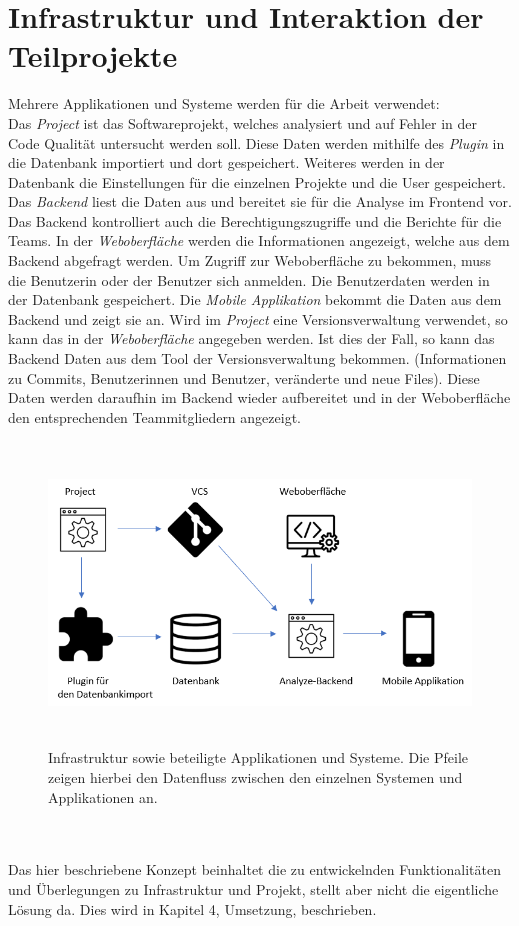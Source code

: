 \section{Infrastruktur und Interaktion der Teilprojekte}
Mehrere Applikationen und Systeme werden für die Arbeit verwendet: \\
Das \textit{Project} ist das Softwareprojekt, welches analysiert und auf Fehler in der Code Qualität untersucht werden soll. Diese Daten werden mithilfe des \textit{Plugin} in die Datenbank importiert und dort gespeichert. Weiteres werden in der Datenbank die Einstellungen für die einzelnen Projekte und die User gespeichert. Das \textit{Backend} liest die Daten aus und bereitet sie für die Analyse im Frontend vor. Das Backend kontrolliert auch die Berechtigungszugriffe und die Berichte für die Teams. In der \textit{Weboberfläche} werden die Informationen angezeigt, welche aus dem Backend abgefragt werden. Um Zugriff zur Weboberfläche zu bekommen, muss die Benutzerin oder der Benutzer sich anmelden. Die Benutzerdaten werden in der Datenbank gespeichert.
Die \textit{Mobile Applikation} bekommt die Daten aus dem Backend und zeigt sie an. Wird im \textit{Project} eine Versionsverwaltung verwendet, so kann das in der \textit{Weboberfläche} angegeben werden. Ist dies der Fall, so kann das Backend Daten aus dem Tool der Versionsverwaltung bekommen. (Informationen zu Commits, Benutzerinnen und Benutzer, veränderte und neue Files). Diese Daten werden daraufhin im Backend wieder aufbereitet und in der Weboberfläche den entsprechenden Teammitgliedern angezeigt.
\begin{figure}[tp]
  \centering
  \includegraphics[height=8cm]{images/infrastruktur.PNG}
 \caption[Infrastruktur und beteiligte Applikationen und Systeme]{Infrastruktur sowie beteiligte Applikationen und Systeme. Die Pfeile zeigen hierbei den Datenfluss zwischen den einzelnen Systemen und Applikationen an.}
  \label{fig:findingsInIDE}
\end{figure}
\\ \\ Das hier beschriebene Konzept beinhaltet die zu entwickelnden Funktionalitäten und Überlegungen zu Infrastruktur und Projekt, stellt aber nicht die eigentliche Lösung da. Dies wird in Kapitel 4, Umsetzung, beschrieben.
\chapterend